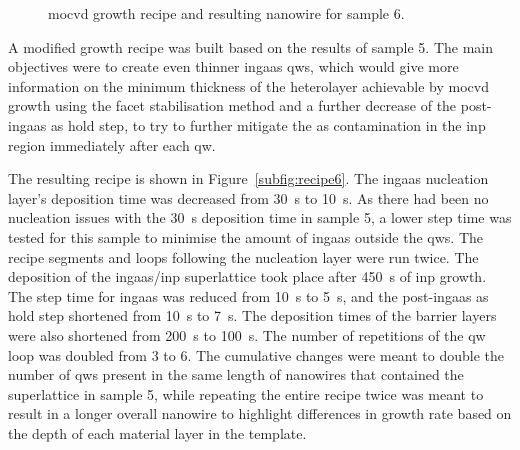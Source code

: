 \begin{figure}
{
    }
    \caption{\acs{mocvd} growth recipe  and resulting nanowire  for sample 6.}
    \label{fig:s6_recipe+OV}
\end{figure}

A modified growth recipe was built based on the results of sample 5. The main objectives were to create even thinner \acs{ingaas} \acl{qw}s, which would give more information on the minimum thickness of the heterolayer achievable by \acs{mocvd} growth using the facet stabilisation method and a further decrease of the post-\acs{ingaas} \acl{as} hold step, to try to further mitigate the \acl{as} contamination in the \acs{inp} region immediately after each \acl{qw}.

The resulting recipe is shown in Figure~\ref{subfig:recipe6}. The \acs{ingaas} nucleation layer's deposition time was decreased from \qty{30}{\second} to \qty{10}{\second}. As there had been no nucleation issues with the \qty{30}{\second} deposition time in sample 5, a lower step time was tested for this sample to minimise the amount of \acs{ingaas} outside the \acl{qw}s. The recipe segments and loops following the nucleation layer were run twice. The deposition of the \acs{ingaas}/\acs{inp} superlattice took place after \qty{450}{\second} of \acs{inp} growth. The step time for \acs{ingaas} was reduced from \qty{10}{\second} to \qty{5}{\second}, and the post-\acs{ingaas} \acl{as} hold step shortened from \qty{10}{\second} to \qty{7}{\second}. The deposition times of the barrier layers were also shortened from \qty{200}{\second} to \qty{100}{\second}. The number of repetitions of the \acl{qw} loop was doubled from \num{3} to \num{6}. The cumulative changes were meant to double the number of \acl{qw}s present in the same length of nanowires that contained the superlattice in sample 5, while repeating the entire recipe twice was meant to result in a longer overall nanowire to highlight differences in growth rate based on the depth of each material layer in the template.

